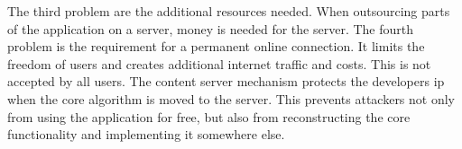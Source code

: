 \newline
The third problem are the additional resources needed.
When outsourcing parts of the application on a server, money is needed for the server.
\newline
The fourth problem is the requirement for a permanent online connection.
It limits the freedom of users and creates additional internet traffic and costs.
This is not accepted by all users.
\newline
\newline
The content server mechanism protects the developers \gls{ip} when the core algorithm is moved to the server.
This prevents attackers not only from using the application for free, but also from reconstructing the core functionality and implementing it somewhere else.
